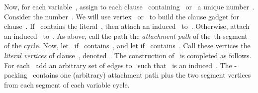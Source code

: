\documentclass[envcountsame,numbook,smallextended]{svjour3}
\numberwithin{equation}{section}
\numberwithin{figure}{section}
\begin{document}
\begin{construction}
  Now, for each variable~,
  assign to each clause~ containing~ or~
  a unique number~.
  Consider the number~.
  We will use vertex~ or~
  to build the clause gadget for clause~.
  If~ contains the literal~, then attach an
  induced~ to~.
  Otherwise,
  attach an induced~ to~.
  As above,
  call the path the \emph{attachment path}
  of the~th segment of the cycle.
  Now, let~
  if ~contains~,
  and let 
  if ~contains~.
  Call these vertices the \emph{literal vertices} of clause~,
  denoted~.
  The construction of~ is completed as follows. For each~ add an arbitrary set of edges to~ such that~ is an induced~.
  The -packing~ contains
  one (arbitrary) attachment path
  plus the two segment vertices
  from each segment
  of each variable cycle.
\end{construction}
\end{document}
